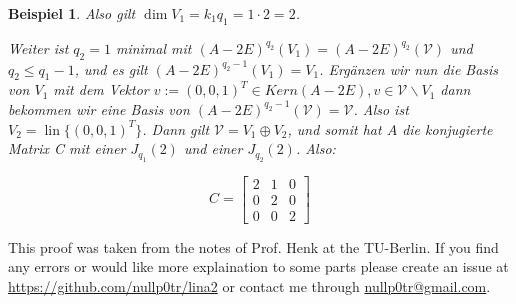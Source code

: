 \documentclass{article}
\newtheorem*{example}{Beispiel}
\newcommand{\V}{\mathcal{V}}
\DeclareMathOperator{\lin}{lin}
\begin{document}
\begin{example}
  Also gilt $\dim V_1 = k_1q_1 = 1 \cdot 2 = 2$.

  Weiter ist $q_2 = 1$ minimal mit $(A-2E)^{q_2}(V_1) = (A-2E)^{q_2}(\V)$ und $q_2 \le q_1-1$,
  und es gilt $(A-2E)^{q_2-1}(V_1) = V_1$. Ergänzen wir nun die Basis von $V_1$ mit dem Vektor
  $v := (0, 0, 1)^T \in Kern (A-2E), v \in \V \backslash V_1$ dann bekommen wir eine Basis
  von $(A-2E)^{q_2-1}(\V)=\V$. Also ist $V_2 = \lin \{(0, 0, 1)^T\}$. Dann gilt
  $\V = V_1 \oplus V_2$, und somit hat $A$ die konjugierte Matrix C mit einer $J_{q_1}(2)$ und
  einer $J_{q_2}(2)$. Also:

  \begin{equation*}
    C =
    \begin{bmatrix}
      2 & 1 & 0 \\
      0 & 2 & 0 \\
      0 & 0 & 2 
    \end{bmatrix}
  \end{equation*}  
  
\end{example}
This proof was taken from the notes of Prof. Henk at the TU-Berlin. If you find any errors
or would like more explaination to some parts please create an issue at
\url{https://github.com/nullp0tr/lina2} or contact me through
\href{mailto:nullp0tr@gmail.com}{nullp0tr@gmail.com}. 
\end{document}
